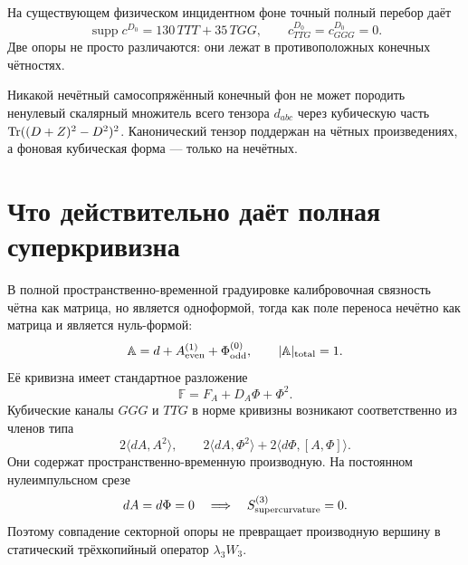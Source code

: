 На существующем физическом инцидентном фоне точный полный перебор даёт
\begin{equation}
 \operatorname{supp}c^{D_0}=130\,TTT+35\,TGG,
 \qquad
 c^{D_0}_{TTG}=c^{D_0}_{GGG}=0.
 \label{eq:v8-baryon-incidence-odd-background-support}
\end{equation}
Две опоры не просто различаются: они лежат в противоположных конечных
чётностях.

\begin{theorem}
Никакой нечётный самосопряжённый конечный фон не может породить ненулевый
скалярный множитель всего тензора $d_{abc}$ через кубическую часть
$\operatorname{Tr}((D+Z)^2-D^2)^2$. Канонический тензор поддержан на чётных произведениях,
а фоновая кубическая форма --- только на нечётных.
\end{theorem}

\section{Что действительно даёт полная суперкривизна}

В полной пространственно-временной градуировке калибровочная связность
чётна как матрица, но является одноформой, тогда как поле переноса нечётно
как матрица и является нуль-формой:
\begin{equation}
 \mathbb A=d+A^{(1)}_{\rm even}+\Phi^{(0)}_{\rm odd},
 \qquad |\mathbb A|_{\rm total}=1.
 \label{eq:v8-baryon-total-odd-superconnection}
\end{equation}
Её кривизна имеет стандартное разложение
\begin{equation}
 \mathbb F=F_A+D_A\Phi+\Phi^2.
 \label{eq:v8-baryon-full-supercurvature-decomposition}
\end{equation}
Кубические каналы $GGG$ и $TTG$ в норме кривизны возникают соответственно
из членов типа
\begin{equation}
 2\langle dA,A^2\rangle,\qquad
 2\langle dA,\Phi^2\rangle
 +2\langle d\Phi,[A,\Phi]\rangle.
 \label{eq:v8-baryon-derivative-cubic-supercurvature-vertices}
\end{equation}
Они содержат пространственно-временную производную. На постоянном
нулеимпульсном срезе
\begin{equation}
 dA=d\Phi=0
 \quad\Longrightarrow\quad
 S^{(3)}_{\rm supercurvature}=0.
 \label{eq:v8-baryon-zero-momentum-supercurvature-cubic-vanishing}
\end{equation}
Поэтому совпадение секторной опоры не превращает производную вершину в
статический трёхкопийный оператор $\lambda_3W_3$.

